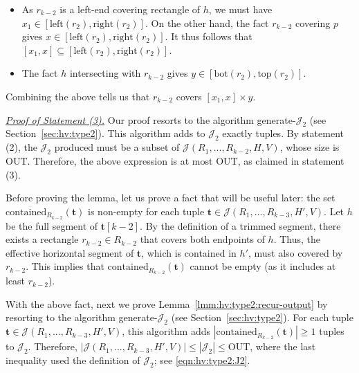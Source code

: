 \documentclass[acmsmall,review,anonymous]{acmart}
\def\vgap{\vspace{1mm}}
\def\extraspacing{\vspace{2mm} \noindent}
\def\J{\mathcal{J}}
\def\xleft{\mathrm{left}}
\def\xright{\mathrm{right}}
\def\ybot{\mathrm{bot}}
\def\ytop{\mathrm{top}}
\def\contained{\mathrm{contained}}
\def\out{\mathrm{OUT}}
\begin{document}
{{{%

\begin{itemize}
    \item As $r_{k-2}$ is a left-end covering rectangle of $h$, we must have $x_1 \in [\xleft(r_2), \xright(r_2)]$. On the other hand, the fact $r_{k-2}$ covering $p$ gives $x \in [\xleft(r_2), \xright(r_2)]$. It thus follows that $[x_1,x] \subseteq [\xleft(r_2), \xright(r_2)]$.

    \vgap

    \item The fact $h$ intersecting with $r_{k-2}$ gives $y \in [\ybot(r_2), \ytop(r_2)]$.
\end{itemize}

\noindent Combining the above tells us that  $r_{k-2}$ covers $[x_1, x] \times y$.

\extraspacing \underline{\em Proof of Statement (3).} Our proof resorts to the algorithm generate-$\J_2$ (see Section~\ref{sec:hv:type2}). This algorithm adds to $\J_2$ exactly
\myeqn{
    \sum_{\bm{t} \in \J(R_1, ..., R_3, H', V)} |\contained_{R_{k-2}}(\bm{t})| \nn
}
tuples. By statement (2), the $\J_2$ produced must be a subset of $\J(R_1,...,R_{k-2},H,V)$, whose size is $\out$.
Therefore, the above expression is at most $\out$, as claimed in statement (3).

\extraspacing {} Before proving the lemma, let us prove a fact that will be useful later: the set $\contained_{R_{k-2}}(\bm{t})$ is non-empty for each tuple $\bm{t} \in \J(R_1,...,R_{k-3},H',V)$. Let $h$ be the full segment of $\bm{t}[k-2]$. By the definition of a trimmed segment, there exists a rectangle $r_{k-2} \in R_{k-2}$ that covers both endpoints of $h$. Thus, the effective horizontal segment of $\bm{t}$, which is contained in $h'$, must also covered by $r_{k-2}$. This implies that $\contained_{R_{k-2}}(\bm{t})$ cannot be empty (as it includes at least $r_{k-2}$). 

\vgap 

With the above fact, next we prove Lemma~\ref{lmm:hv:type2:recur-output} by resorting to the algorithm generate-$\J_2$ (see Section~\ref{sec:hv:type2}). For each tuple $\bm{t} \in \J(R_1,...,R_{k-3},H',V)$, this algorithm adds $|\contained_{R_{k-2}}(\bm{t})|\geq 1$ tuples to $\J_2$. Therefore, $|\J(R_1,...,R_{k-3},H',V)| \le |\J_2| \le \out$, where the last inequality used the definition of $\J_2$; see \eqref{eqn:hv:type2:J2}.

}}}
\end{document}
